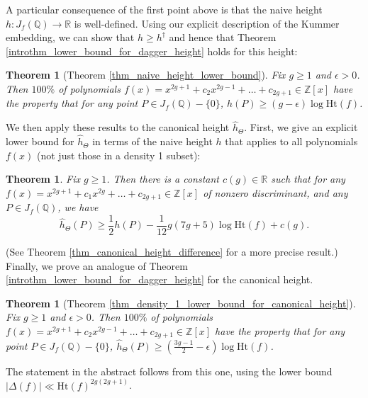 \documentclass{article} %
\newtheorem{theorem}[proposition]{Theorem}
\numberwithin{equation}{section}
\newcommand{\R}{\mathbb{R}}
\newcommand{\Q}{\mathbb{Q}}
\newcommand{\Z}{\mathbb{Z}}
\newcommand{\height}{\mathrm{Ht}}
\begin{document}
A particular consequence of the first point above is that the naive height $h : J_f(\Q) \to \R$ is well-defined. Using our explicit description of the Kummer embedding, we can show that $h\geq h^{\dagger}$ and hence that Theorem \ref{introthm_lower_bound_for_dagger_height} holds for this height: 
\begin{theorem}[Theorem \ref{thm_naive_height_lower_bound}]\label{introthm_lower_bound_for_naive_height}
    Fix $g \geq 1$ and $\epsilon > 0$. Then $100\%$ of polynomials $f(x) = x^{2g+1} + c_2 x^{2g-1} + \dots + c_{2g+1} \in \Z[x]$ have the property that for any point $P \in J_f(\Q) - \{ 0 \}$, $h(P) \geq (g - \epsilon) \log \height(f)$.
\end{theorem}
We then apply these results to the canonical height $\widehat{h}_\Theta$. First, we give an explicit lower bound for $\widehat{h}_\Theta$ in terms of the naive height $h$ that applies to all polynomials $f(x)$ (not just those in a density 1 subset):
\begin{theorem}\label{introthm_lower_bound_for_canonical_height_in_terms_of_naive_height}
    Fix $g \geq 1$. Then there is a constant $c(g) \in \R$ such that for any $f(x) = x^{2g+1} + c_1 x^{2g} + \dots + c_{2g+1} \in \Z[x]$ of nonzero discriminant, and any $P \in J_f(\Q)$, we have
    \[ \widehat{h}_\Theta(P) \geq \frac{1}{2} h(P) - \frac{1}{12} g(7g+5) \log \height(f) + c(g). \]
\end{theorem}
(See Theorem \ref{thm_canonical_height_difference} for a more precise result.) Finally, we prove an analogue of Theorem \ref{introthm_lower_bound_for_dagger_height} for the canonical height.
\begin{theorem}[Theorem \ref{thm_density_1_lower_bound_for_canonical_height}]\label{introthm_lower_bound_for_canonical_height}
    Fix $g \geq 1$ and $\epsilon > 0$. Then $100\%$ of polynomials $f(x) = x^{2g+1} + c_2 x^{2g-1} + \dots + c_{2g+1} \in \Z[x]$ have the property that for any point $P \in J_f(\Q) - \{ 0 \}$, $\widehat{h}_\Theta(P) \geq (\frac{3g-1}{2} - \epsilon) \log \height(f)$.
\end{theorem}
The statement in the abstract follows from this one, using the lower bound $|\Delta(f)| \ll \height(f)^{2g(2g+1)}$.
\end{document}

